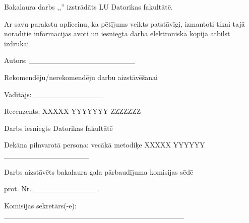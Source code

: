 \newcommand{\makedocpagee}{
		\thispagestyle{empty} 
		Bakalaura darbs ,,\@nosaukums''
		izstrādāts LU Datorikas fakultātē.
		\vspace{3cm} 
		
		Ar savu parakstu apliecinu, ka pētījums veikts patstāvīgi, 
		izmantoti tikai tajā norādītie informācijas avoti un iesniegtā darba elektroniskā kopija atbilst izdrukai.

		Autors: \_\_\_\_\_\_\_\_\_\_\_\_\_\_\_\_\_\_\_\_
		{\@autors}
		\vspace{3cm} 
		
		Rekomendēju/nerekomendēju darbu aizstāvēšanai

		Vadītājs: {\@vaditajs} 
		\_\_\_\_\_\_\_\_\_\_\_\_\_ {\@datums}
		
		\vspace{3cm} 
		{\raggedright
		Recenzents: XXXXX YYYYYYY ZZZZZZZ}

		\vspace{3cm}
		Darbs iesniegts Datorikas fakultātē  {\@datums}

		Dekāna pilnvarotā persona: vecākā metodiķe XXXXX YYYYYY \_\_\_\_\_\_\_\_\_\_\_\_\_\_\_\_
		\vspace{3cm} 
		
		Darbs aizstāvēts bakalaura gala pārbaudījuma komisijas sēdē

		{\@datums} prot. Nr.
		\_\_\_\_\_\_\_\_\_\_\_\_.

		Komisijas sekretārs(-e):  \_\_\_\_\_\_\_\_\_\_\_\_\_\_\_\_\_\_\_\_\_\_\_\_\_\_\_\_\_\_\_\_\_\_
}
\makedocpagee